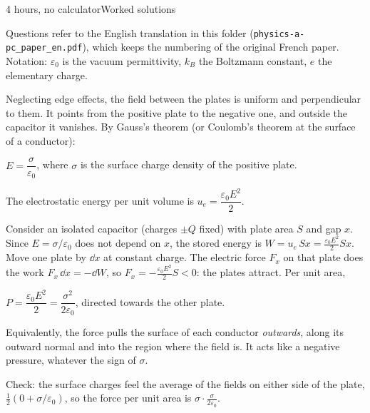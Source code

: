 \documentclass[11pt,a4paper]{article}
\begin{document}
         {4 hours, no calculator}{Worked solutions}

\begin{remark}
Questions refer to the English translation in this folder (\texttt{physics-a-pc\_paper\_en.pdf}),
which keeps the numbering of the original French paper. Notation: $\varepsilon_0$ is the
vacuum permittivity, $k_B$ the Boltzmann constant, $e$ the elementary charge.
\end{remark}


Neglecting edge effects, the field between the plates is uniform and perpendicular to them.
It points from the positive plate to the negative one, and outside the capacitor it vanishes.
By Gauss's theorem (or Coulomb's theorem at the surface of a conductor):
\begin{result}
$E = \dfrac{\sigma}{\varepsilon_0}$, \quad where $\sigma$ is the surface charge density of the
positive plate.
\end{result}

The electrostatic energy per unit volume is $u_e = \dfrac{\varepsilon_0E^2}{2}$.

Consider an isolated capacitor (charges $\pm Q$ fixed) with plate area $S$ and gap $x$.
Since $E = \sigma/\varepsilon_0$ does not depend on $x$, the stored energy is
$W = u_e\,Sx = \frac{\varepsilon_0E^2}{2}Sx$. Move one plate by $\dd x$ at constant charge.
The electric force $F_x$ on that plate does the work $F_x\,\dd x = -\dd W$, so
$F_x = -\frac{\varepsilon_0E^2}{2}S < 0$: the plates attract. Per unit area,
\begin{result}
$P = \dfrac{\varepsilon_0E^2}{2} = \dfrac{\sigma^2}{2\varepsilon_0}$, directed towards the
other plate.
\end{result}
Equivalently, the force pulls the surface of each conductor \emph{outwards}, along its outward
normal and into the region where the field is. It acts like a negative pressure, whatever the
sign of $\sigma$.

Check: the surface charges feel the average of the fields on either side of the plate,
$\frac12(0 + \sigma/\varepsilon_0)$, so the force per unit area is
$\sigma\cdot\frac{\sigma}{2\varepsilon_0}$.

\end{document}
